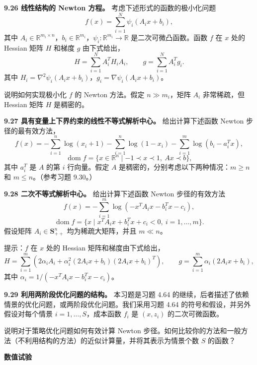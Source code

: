 \documentclass[UTF8, 12pt, fontset=fandol, oneside]{ctexart}
\begin{document}
\noindent\textbf{9.26 线性结构的 Newton 方程。}\quad
考虑下述形式的函数的极小化问题
\begin{equation}
f(x)=\sum_{i=1}^N\psi_i(A_ix+b_i),
\tag{9.63}
\end{equation}
其中 $A_i\in\mathbb{R}^{m_i\times n}$，$b_i\in\mathbb{R}^{m_i}$，$\psi_i:\mathbb{R}^{m_i}\to\mathbb{R}$ 是二次可微凸函数。函数 $f$ 在 $x$ 处的 Hessian 矩阵 $H$ 和梯度 $g$ 由下式给出，
\begin{equation}
H=\sum_{i=1}^N A_i^T H_i A_i,\qquad
g=\sum_{i=1}^N A_i^T g_i.
\tag{9.64}
\end{equation}
其中 $H_i=\nabla^2\psi_i(A_ix+b_i)$，$g_i=\nabla\psi_i(A_ix+b_i)$。

说明如何实现极小化 $f$ 的 Newton 方法。假定 $n\gg m_i$，矩阵 $A_i$ 非常稀疏，但 Hessian 矩阵 $H$ 是稠密的。

\noindent\textbf{9.27 具有变量上下界约束的线性不等式解析中心。}\quad
给出计算下述函数 Newton 步径的最有效方法，
\[
f(x)=-\sum_{i=1}^n\log(x_i+1)-\sum_{i=1}^n\log(1-x_i)-\sum_{i=1}^m\log(b_i-a_i^Tx),
\]
\[
\operatorname{dom} f=\{x\in\mathbb{R}^n\mid -1\prec x\prec1,\ Ax\prec b\},
\]
其中 $a_i^T$ 是 $A$ 的第 $i$ 行向量。假定 $A$ 是稠密的，分别考虑以下两种情况：$m\geq n$ 和 $m\leq n$。（参考习题 9.30。）

\noindent\textbf{9.28 二次不等式解析中心。}\quad
给出计算下述函数 Newton 步径的有效方法
\[
f(x)=-\sum_{i=1}^m\log(-x^TA_ix-b_i^Tx-c_i),
\]
\[
\operatorname{dom} f=\{x\mid x^TA_ix+b_i^Tx+c_i<0,\ i=1,\ldots,m\}.
\]
假设矩阵 $A_i\in\mathbf{S}_{++}^n$ 均为稀疏大矩阵，并且 $m\ll n$。

提示：$f$ 在 $x$ 处的 Hessian 矩阵和梯度由下式给出，
\[
H=\sum_{i=1}^m(2\alpha_iA_i+\alpha_i^2(2A_ix+b_i)(2A_ix+b_i)^T),
\qquad
g=\sum_{i=1}^m\alpha_i(2A_ix+b_i),
\]
其中 $\alpha_i=1/(-x^TA_ix-b_i^Tx-c_i)$。

\noindent\textbf{9.29 利用两阶段优化问题的结构。}\quad
本习题是习题 4.64 的继续，后者描述了依赖情景的优化问题，或两阶段优化问题。我们采用习题 4.64 的符号和假设，并另外假设对每个情景 $i=1,\ldots,S$，成本函数 $f_i$ 是 $(x,z_i)$ 的二次可微函数。

说明对于策略优化问题如何有效计算 Newton 步径。如何比较你的方法和一般方法（不利用结构的方法）的近似计算量，并将其表示为情景个数 $S$ 的函数？

\noindent\textbf{数值试验}
\end{document}
